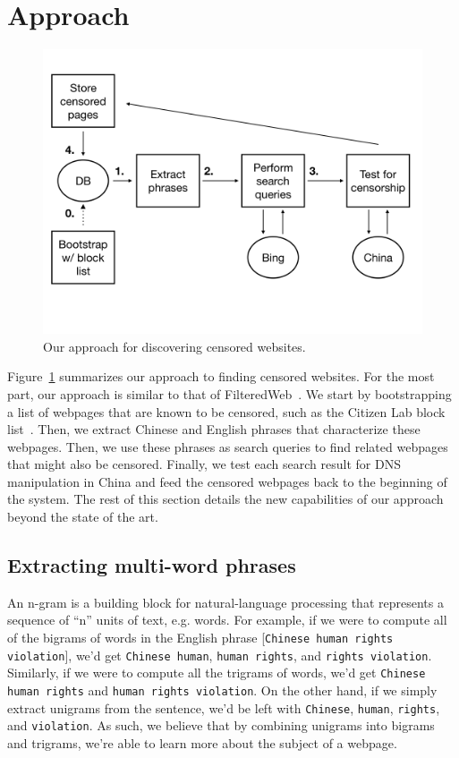 \section{Approach}

\begin{figure}[t]
  \centering
  \includegraphics[scale=0.23]{figures/arch-2}
  \caption{\label{arch}Our approach for discovering censored websites.}
\end{figure}

Figure~\ref{arch} summarizes our approach to finding censored
websites. For the most part, our approach is similar to that of
FilteredWeb~\cite{darer2017filteredweb}. We start by bootstrapping a
list of webpages that are known to be censored, such as the Citizen
Lab block list~\cite{citizenlab:block}.  Then, we extract Chinese and
English phrases that characterize these webpages.  Then, we use these
phrases as search queries to find related webpages that might also be
censored. Finally, we test each search result for DNS manipulation in
China and feed the censored webpages back to the beginning of the
system. The rest of this section details the new capabilities of our
approach beyond the state of the art.

\subsection{Extracting multi-word phrases}
An n-gram is a building block for natural-language processing that
represents a sequence of ``n'' units of text, e.g. words. For example,
if we were to compute all of the bigrams of words in the English phrase
[\texttt{Chinese human rights violation}], we'd get \texttt{Chinese
human}, \texttt{human rights}, and \texttt{rights violation}. Similarly,
if we were to compute all the trigrams of words, we'd get
\texttt{Chinese human rights} and \texttt{human rights violation}. On the
other hand, if we simply extract unigrams from the sentence,
we'd be left with \texttt{Chinese}, \texttt{human}, \texttt{rights}, and
\texttt{violation}. As such, we believe that by combining unigrams
into bigrams and trigrams, we're able to learn more about the subject
of a webpage.

